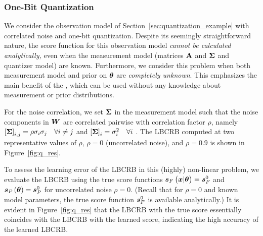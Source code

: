 {\subsubsection{One-Bit Quantization}
{We consider the observation model of Section~\ref{sec:quantization_example} with correlated noise and one-bit quantization. }Despite its seemingly straightforward nature,  the score function for this observation model \emph{cannot be calculated analytically,} {even when the measurement model (matrices $\mathbf{A}$ and $\mathbf{\Sigma}$ and quantizer model) are known. Furthermore, we consider this problem when both measurement model and prior on $\bm{\theta}$ are  \emph{completely unknown}.
}
This emphasizes the main benefit of the \name{}, which can be used without any knowledge about measurement or prior distributions.  




{For the noise correlation, we set $\mathbf{\Sigma}$ in the measurement model such that
}
the noise components in $\randomvec{W}$ are correlated pairwise with correlation factor $\rho$, namely $\left[{\mathbf{\Sigma}}\right]_{i,j}=\rho \sigma_i\sigma_j \quad\forall i\neq j$ and $\left[{\mathbf{\Sigma}}\right]_{i}= \sigma_i^2\quad \forall i$  . 
{%
The LBCRB  computed at %
two {representative values of $\rho$, $\rho=0$ (uncorrelated noise), and  $\rho=0.9$}
is shown}
in Figure~\ref{fig:q_res}.

{To assess the learning error of the LBCRB in this (highly) non-linear problem,} we evaluate the LBCRB using the true score functions  $\bm{s}_{F}\left(\bm{x}|\bm{\theta}\right)=\bm{s}_F^0$ and $\bm{s}_{P}\left(\bm{\theta}\right)=\bm{s}_P^0$ for uncorrelated noise $\rho=0$. {(Recall that 
 for $\rho=0$ and known model parameters, the true score function $\bm{s}_F^0$ is available analytically.)} 
  It is evident {in Figure~\ref{fig:q_res}} that the LBCRB with the true score {essentially} coincides with the LBCRB with the learned score, indicating {%
  the high accuracy of the learned LBCRB. %
  }

}
